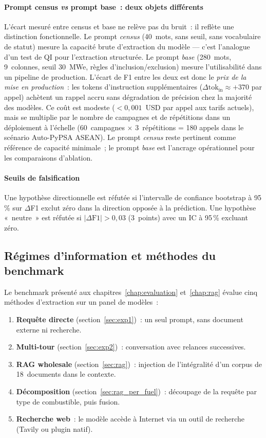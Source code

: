 \paragraph{Prompt census \emph{vs} prompt base~: deux objets différents}
L'écart mesuré entre census et base ne relève pas du bruit~: il reflète
une distinction fonctionnelle. Le prompt \emph{census} (40~mots, sans
seuil, sans vocabulaire de statut) mesure la capacité brute d'extraction
du modèle — c'est l'analogue d'un test de QI pour l'extraction
structurée. Le prompt \emph{base} (280~mots, 9~colonnes, seuil 30~MWe,
règles d'inclusion/exclusion) mesure l'utilisabilité dans un pipeline de
production. L'écart de F1 entre les deux est donc le \emph{prix de la
mise en production}~: les tokens d'instruction supplémentaires
($\Delta\text{tok}_\text{in} \approx +370$ par appel) achètent un
rappel accru sans dégradation de précision chez la majorité des modèles.
Ce coût est modeste ($< 0{,}001$~USD par appel aux tarifs actuels), mais
se multiplie par le nombre de campagnes et de répétitions dans un
déploiement à l'échelle (60~campagnes $\times$ 3~répétitions = 180
appels dans le scénario Auto-PyPSA ASEAN). Le prompt \emph{census}
reste pertinent comme référence de capacité minimale~; le prompt
\emph{base} est l'ancrage opérationnel pour les comparaisons
d'ablation.

\paragraph{Seuils de falsification} Une hypothèse directionnelle est réfutée
si l'intervalle de confiance bootstrap à 95\,\% sur $\Delta$F1 exclut zéro
dans la direction opposée à la prédiction. Une hypothèse «~neutre~» est
réfutée si $|\Delta\text{F1}| > 0{,}03$ (3~points) avec un IC à 95\,\%
excluant zéro.

\subsection{Régimes d'information et méthodes du benchmark}\label{sec:regime-linkage}

Le benchmark présenté aux chapitres~\ref{chap:evaluation} et~\ref{chap:rag}
évalue cinq méthodes d'extraction sur un panel de modèles~:

\begin{enumerate}
\item \textbf{Requête directe} (section~\ref{sec:exp1})~: un seul prompt,
  sans document externe ni recherche.
\item \textbf{Multi-tour} (section~\ref{sec:exp2})~: conversation avec
  relances successives.
\item \textbf{RAG wholesale} (section~\ref{sec:rag})~: injection de
  l'intégralité d'un corpus de 18~documents dans le contexte.
\item \textbf{Décomposition} (section~\ref{sec:rag_per_fuel})~: découpage
  de la requête par type de combustible, puis fusion.
\item \textbf{Recherche web}~: le modèle accède à Internet via un outil
  de recherche (Tavily ou plugin natif).
\end{enumerate}

